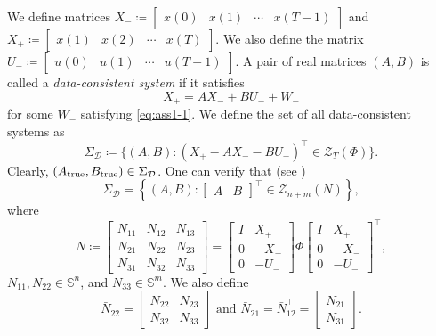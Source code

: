 \documentclass[9pt,shortpaper,twoside,web]{ieeecolor}
\newcommand{\bbma}{\begin{bmatrix}}
\newcommand{\ebma}{\end{bmatrix}}
\begin{document}
We define matrices $X_-\coloneqq\bbma x(0) & x(1) & \cdots & x(T-1) \ebma$ and $X_+\coloneqq\bbma x(1) & x(2) & \cdots & x(T) \ebma$. We also define the matrix $U_-\coloneqq\bbma u(0) & u(1) & \cdots & u(T-1) \ebma$.
A pair of real matrices $(A,B)$ is called a \emph{data-consistent system} if it satisfies
\begin{equation}
X_+=AX_-+BU_-+W_-
\end{equation}
for some $W_-$ satisfying \eqref{eq:ass1-1}. We define the set of all data-consistent systems as
\begin{equation}
\label{eq:8}
\Sigma_\mathcal{D}\coloneqq \{(A,B):(X_+-AX_--BU_-)^\top\in \mathcal{Z}_{T}(\Phi)\}.
\end{equation}
Clearly, $(A_\textup{true},B_\textup{true}) \in \Sigma_\mathcal{D}$. One can verify that (see \cite[Lem. 4]{HenkSlemma})
\begin{equation}
\label{eq:explaining_QMI_induced}
\Sigma_\mathcal{D}=\left\{(A,B): \begin{bmatrix}
A & B
\end{bmatrix}^\top\in\mathcal{Z}_{n+m}(N)\right\},
\end{equation}
where
\begin{equation}
N\coloneqq\bbma N_{11} & N_{12} & N_{13} \\ N_{21} & N_{22} & N_{23} \\ N_{31} & N_{32} & N_{33} \ebma = \bbma I & X_+ \\ 0 & -X_- \\ 0 & -U_- \ebma \Phi \bbma I & X_+ \\ 0 & -X_- \\ 0 & -U_- \ebma^\top,
\label{eq:def_N}
\end{equation} 
$N_{11},N_{22} \in \mathbb{S}^n$, and $N_{33} \in \mathbb{S}^m$. We also define
\begin{equation}
\bar{N}_{22}=\begin{bmatrix}
N_{22} & N_{23} \\ N_{32} & N_{33}
\end{bmatrix}\text{ and }\bar{N}_{21}=\bar{N}_{12}^\top=\begin{bmatrix}
N_{21} \\ N_{31} 
\end{bmatrix}.
\end{equation}
\end{document}
